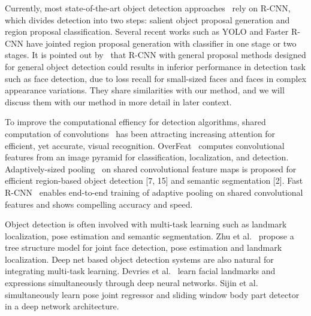 Currently, most state-of-the-art object detection approaches~\cite{ouyang2014deepid, li2015convolutional, erhan2014scalable,girshick2015fast} rely on R-CNN, which divides detection into two steps: salient object proposal generation and region proposal classification. Several recent works such as YOLO and Faster R-CNN have jointed region proposal generation with classifier in one stage or two stages. It is pointed out by~\cite{farfade2015multi} that R-CNN with general proposal methods designed for general object detection could results in inferior performance in detection task such as face detection, due to loss recall for small-sized faces and faces in complex appearance variations. They share similarities with our method, and we will discuss them with our method in more detail in later context.  


To improve the computational effiency for detection algorithms, shared computation of convolutions~\cite{sermanet2013overfeat, he2014spatial, ren2015faster, long2015fully} has been attracting increasing attention for efficient, yet accurate, visual recognition. OverFeat~\cite{sermanet2013overfeat} computes convolutional features from an image pyramid for classification, localization, and detection. Adaptively-sized pooling~\cite{he2014spatial} on shared convolutional feature maps is proposed for efficient region-based object detection [7, 15] and semantic segmentation [2]. Fast R-CNN~\cite{ren2015faster} enables end-to-end training of adaptive pooling on shared convolutional features and shows compelling accuracy and speed.

Object detection is often involved with multi-task learning such as landmark localization, pose estimation and semantic segmentation. Zhu et al.~\cite{zhu2012face} propose a tree structure model for joint face detection, pose estimation and landmark localization. Deep net based object detection systems are also natural for integrating multi-task learning. Devries et al.~\cite{devries2014multi} learn facial landmarks and expressions simultaneously through deep neural networks. Sijin et al.~\cite{li2014heterogeneous} simultaneously learn pose joint regressor and sliding window body part detector in a deep network architecture. 
